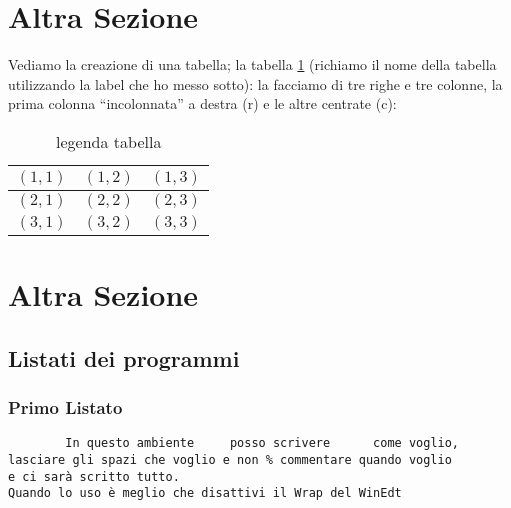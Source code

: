 \section{Altra Sezione}                 %
Vediamo la creazione di una tabella; la tabella \ref{tab:uno}
(richiamo il nome della tabella utilizzando la label che ho messo sotto):
la facciamo di tre righe e tre colonne, la prima colonna
``incolonnata'' a destra (r) e le altre centrate (c):\\
\begin{table}[h]                        %
\begin{center}                          %
\begin{tabular}{r|c|c}                  %
\hline \hline                           %
$(1,1)$ & $(1,2)$ & $(1,3)$\\           %
\hline                                  %
$(2,1)$ & $(2,2)$ & $(2,3)$\\           %
\hline                                  %
$(3,1)$ & $(3,2)$ & $(3,3)$\\
\hline \hline                           %
\end{tabular}
\caption[legenda elenco tabelle]{legenda tabella}\label{tab:uno}
\end{center}
\end{table}
\section{Altra Sezione}\label{sec:prova}%
\subsection{Listati dei programmi}
\subsubsection{Primo Listato}
\begin{verbatim}
        In questo ambiente     posso scrivere      come voglio,
lasciare gli spazi che voglio e non % commentare quando voglio
e ci sarà scritto tutto.
Quando lo uso è meglio che disattivi il Wrap del WinEdt
\end{verbatim}